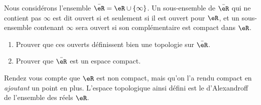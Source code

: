 
\begin{exercice}\label{exo0088}

Nous considérons l'ensemble $\bar\eR=\eR\cup\{\infty\}$. Un sous-ensemble de $\bar\eR$ qui ne contient pas $\infty$ est dit ouvert si et seulement si il est ouvert pour $\eR$, et un sous-ensemble contenant $\infty$ sera ouvert si son complémentaire est compact dans $\eR$.

\begin{enumerate}

\item
Prouver que ces ouverts définissent bien une topologie sur $\bar\eR$.

\item
Prouver que $\bar\eR$ est un espace compact.

\end{enumerate}
Rendez vous compte que $\eR$ est non compact, mais qu'on l'a rendu compact en \emph{ajoutant} un point en plus. L'espace topologique ainsi défini est le  d'Alexandroff de l'ensemble des réels $\eR$.

\end{exercice}
